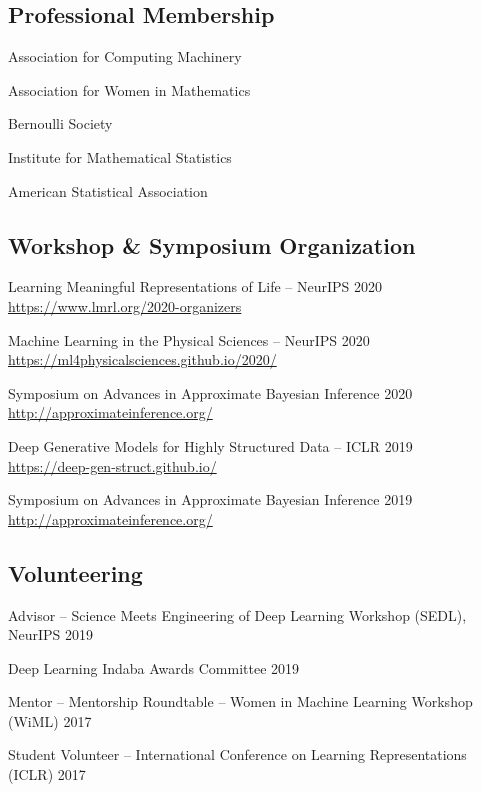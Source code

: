 \documentclass[letterpaper,200pt]{article}
\renewenvironment{itemize}{
  \begin{list}{}{
    \setlength{\leftmargin}{1.5em}
  }
}{
  \end{list}
}
\begin{document}
\subsection*{Professional Membership}
\begin{itemize}
	\item Association for Computing Machinery
	\item Association for Women in Mathematics
	\item Bernoulli Society 
	\item Institute for Mathematical Statistics
	\item American Statistical Association
\end{itemize}

\subsection*{Workshop \& Symposium Organization}
\begin{itemize}	
	\item Learning Meaningful Representations of Life -- NeurIPS \hfill 2020\\
	        \url{https://www.lmrl.org/2020-organizers}
	\item Machine Learning in the Physical Sciences -- NeurIPS \hfill 2020\\
	        \url{https://ml4physicalsciences.github.io/2020/}
	\item Symposium on Advances in Approximate Bayesian Inference \hfill 2020\\
		\url{http://approximateinference.org/}
	\item Deep Generative Models for Highly Structured Data -- ICLR \hfill 2019\\
		\url{https://deep-gen-struct.github.io/}
	\item Symposium on Advances in Approximate Bayesian Inference \hfill 2019\\
		\url{http://approximateinference.org/}
\end{itemize}

\subsection*{Volunteering}
\begin{itemize}
	\item Advisor -- Science Meets Engineering of Deep Learning Workshop (SEDL), NeurIPS \hfill 2019
        \item Deep Learning Indaba Awards Committee \hfill 2019
	\item Mentor -- Mentorship Roundtable -- Women in Machine Learning Workshop (WiML) \hfill 2017
	\item Student Volunteer -- International Conference on Learning Representations (ICLR) \hfill 2017
\end{itemize}
\end{document}
